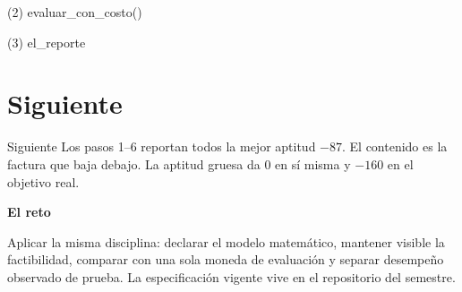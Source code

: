 \begin{frame}[fragile]{(2) evaluar\_con\_costo()}

\end{frame}

\begin{frame}[fragile]{(3) el\_reporte}

\end{frame}


\section{Siguiente}

\begin{frame}{Siguiente}
Los pasos 1--6 reportan todos la mejor aptitud \(-87\). El contenido es la factura que baja debajo. La aptitud gruesa da 0 en sí misma y \(-160\) en el objetivo real.

\vspace{0.8em}
\textbf{El reto }

Aplicar la misma disciplina: declarar el modelo matemático, mantener visible la factibilidad, comparar con una sola moneda de evaluación y separar desempeño observado de prueba. La especificación vigente vive en el repositorio del semestre.
\end{frame}

